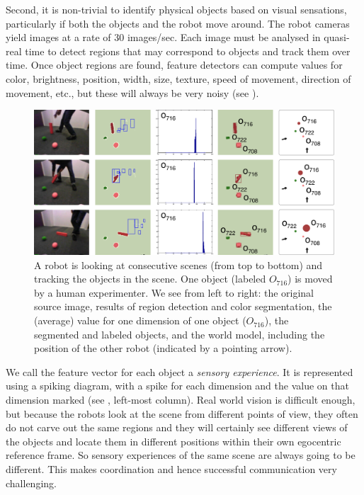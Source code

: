 Second, it is non-trivial to identify physical objects based on visual sensations,
particularly if both the objects and the robot move around. The robot
cameras yield images at a rate of 30 images/sec. Each image must be
analysed in quasi-real time to detect regions that may correspond to objects
and track them over time. Once object regions are found, feature detectors can compute values for color,
brightness, position, width, size, texture, speed of movement,
direction of movement, etc., but these will always be very noisy (see ). 
\begin{figure}[htbp]
  \centerline{\includegraphics[width=.85\textwidth]{chap10/figs/png-perception}}
\caption{\label{fig:png-perception} 
A robot is looking at consecutive scenes (from top to bottom) and tracking the objects in the scene. One object (labeled $O_{716}$)
is moved by a human experimenter.  We see from left to right: the original source image, results of region detection and 
color segmentation, the (average) value for one dimension of one object ($O_{716}$), the segmented and labeled objects, 
and the world model, including the position of the other robot (indicated by a pointing arrow). }
\end{figure}

We call the feature vector for each object a {\it sensory experience}. 
It is represented using a spiking 
diagram, with a spike for each dimension and the value on that dimension marked (see 
, left-most column). Real
world vision is difficult enough, but because the robots look at the
scene from different points of view, they often do not carve out the
same regions and they will certainly see different views of the
objects and locate them in different positions within their own
egocentric reference frame. So sensory experiences of the same scene
are always going to be different. This makes coordination and hence successful
communication very challenging. 

